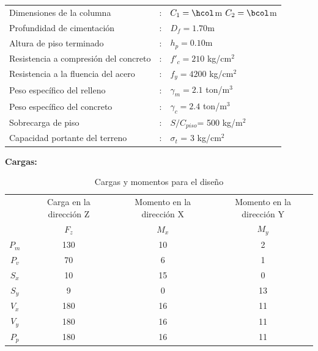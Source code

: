 \documentclass{article}%
\begin{document}
\begin{table}[h!]
    \centering

    \begin{tabular}{lcl} %
        Dimensiones de la columna               &:& $C_1        = \hcol$m \quad $C_2 = \bcol$m\\
        Profundidad de cimentación              &:& $D_f        = 1.70 $m\\
        Altura de piso terminado                &:& $h_p        = 0.10$m\\
        Resistencia a compresión del concreto   &:& $f'_c       = 210$ kg/cm$^2$ \\
        Resistencia a la fluencia del acero     &:& $f_y        = 4200$ kg/cm$^2$ \\
        Peso específico del relleno             &:& $\gamma_m   = 2.1$ ton/m$^3$ \\
        Peso específico del concreto            &:& $\gamma_c   = 2.4$ ton/m$^3$ \\
        Sobrecarga de piso                      &:& $S/C_{piso}$= 500 kg/m$^2$ \\ 
        Capacidad portante del terreno          &:& $\sigma_t$  = 3 kg/cm$^2$  \\ %
        
    \end{tabular}
\end{table}

\textbf{Cargas:}


\begin{table}[h!]
    \centering
    \begin{tabular}{cccc} \toprule
         & Carga en la dirección Z & Momento en la dirección X & Momento en la dirección Y  \\ 
         & $F_z$ & $M_x $ & $M_y$ \\ \midrule
        $P_m$ & 130& 10 & 2 \\
        $P_v$ & 70 & 6 & 1 \\
        $S_x$ & 10 & 15 & 0 \\
        $S_y$ & 9 & 0 & 13 \\
        $V_x$ & 180 & 16 & 11 \\
        $V_y$ & 180 & 16 & 11 \\
        $P_p$ & 180 & 16 & 11 \\\bottomrule
    \end{tabular}
    \caption{Cargas y momentos para el diseño}
    \label{tab:my_label}
\end{table}
\end{document}
